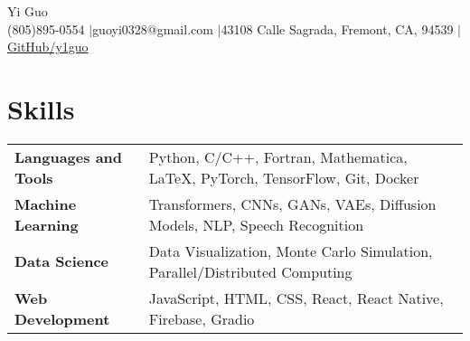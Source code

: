 \documentclass[letterpaper,12pt]{article}
\begin{document}
\newcommand{\name}{Yi Guo}
\newcommand{\phone}{(805)895-0554}
\newcommand{\email}{guoyi0328@gmail.com}
\newcommand{\address}{43108 Calle Sagrada, Fremont, CA, 94539}
\newcommand{\github}{y1guo}
\newcommand{\linkedin}{y1guo}
\newcommand{\website}{https://y1guo.github.io}

\begin{center}
    \Huge \name \\
    \vspace{1pt}
    \small \phone 
    $|$\email
    $|$\address
    $|$\href{https://github.com/\github}{GitHub/\github}
    \vspace{-10pt}
\end{center}





\vspace{-0.9em}
\section{Skills}
\vspace{0.3em}

\begin{tabular}{p{10em} p{33em}}
    \textbf{Languages and Tools} 
    & Python, C/C++, Fortran, Mathematica, \LaTeX, PyTorch, TensorFlow, Git, Docker \\
    \textbf{Machine Learning}
    & Transformers, CNNs, GANs, VAEs, Diffusion Models, NLP, Speech Recognition \\
    \textbf{Data Science} 
    & Data Visualization, Monte Carlo Simulation, Parallel/Distributed Computing \\
    \textbf{Web Development}
    & JavaScript, HTML, CSS, React, React Native, Firebase, Gradio \\
\end{tabular}


\vspace{0.1em}
\end{document}
